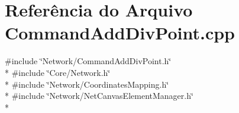 \section{Referência do Arquivo Command\+Add\+Div\+Point.\+cpp}
\label{_command_add_div_point_8cpp}
{\ttfamily \#include \char`\"{}Network/\+Command\+Add\+Div\+Point.\+h\char`\"{}}\\*
{\ttfamily \#include \char`\"{}Core/\+Network.\+h\char`\"{}}\\*
{\ttfamily \#include \char`\"{}Network/\+Coordinates\+Mapping.\+h\char`\"{}}\\*
{\ttfamily \#include \char`\"{}Network/\+Net\+Canvas\+Element\+Manager.\+h\char`\"{}}\\*
